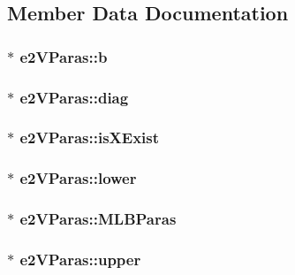 \subsection{Member Data Documentation}
\hypertarget{structe2VParas_a80d7971b5061c83b0983f41cbcb9a6e6}{
\subsubsection[{b}]{$\ast$ {\bf e2VParas::b}}}
\label{structe2VParas_a80d7971b5061c83b0983f41cbcb9a6e6}
\hypertarget{structe2VParas_a6cac10a1d4542aba72bfd8995d59deae}{
\subsubsection[{diag}]{$\ast$ {\bf e2VParas::diag}}}
\label{structe2VParas_a6cac10a1d4542aba72bfd8995d59deae}
\hypertarget{structe2VParas_a0aa09b653e20487edafa66bdf118ae48}{
\subsubsection[{isXExist}]{$\ast$ {\bf e2VParas::isXExist}}}
\label{structe2VParas_a0aa09b653e20487edafa66bdf118ae48}
\hypertarget{structe2VParas_a6036626301d5765def554aadddea0ae3}{
\subsubsection[{lower}]{$\ast$ {\bf e2VParas::lower}}}
\label{structe2VParas_a6036626301d5765def554aadddea0ae3}
\hypertarget{structe2VParas_adbc014a3c6f625888247c1c8f2d13ecc}{
\subsubsection[{MLBParas}]{$\ast$ {\bf e2VParas::MLBParas}}}
\label{structe2VParas_adbc014a3c6f625888247c1c8f2d13ecc}
\hypertarget{structe2VParas_aa47e1f24e424418952a31e4d943b961e}{
\subsubsection[{upper}]{$\ast$ {\bf e2VParas::upper}}}
